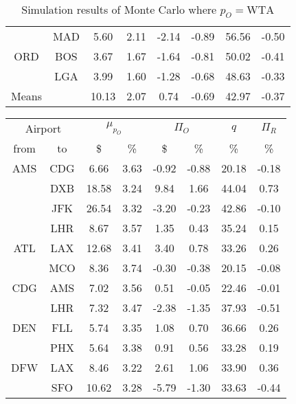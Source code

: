 \begin{table}
\begin{center}
\begin{tabular}{c c | c c | c c | c | c }
~    &  MAD  &    5.60  &  2.11  &   -2.14  &  -0.89  &  56.56  &  -0.50 \\[.5ex]
ORD  &  BOS  &    3.67  &  1.67  &   -1.64  &  -0.81  &  50.02  &  -0.41 \\
~    &  LGA  &    3.99  &  1.60  &   -1.28  &  -0.68  &  48.63  &  -0.33 \\
\midrule
Means &  ~   &   10.13  &  2.07  &    0.74  &  -0.69  &  42.97  &  -0.37 \\
    \bottomrule
\end{tabular}
\caption{Simulation results of Monte Carlo where $p_O = \mbox{WTA}$}
\label{tbl:resultsSecond}
\end{center}
\end{table}


\begin{table}
\begin{center}
\begin{tabular}{c c | c c | c c | c | c }
\toprule
\multicolumn{2}{c|}{Airport}  &  \multicolumn{2}{c|}{$\mu_{p_O}$} & \multicolumn{2}{c|}{$\Pi_O$}  &  $q$  & $\Pi_R$ \\[.4ex]
from  &  to  &  \$  & \%  &  \$  & \%  & \%  & \% \\
    \midrule
AMS  &  CDG  &    6.66  &  3.63  &   -0.92  &  -0.88  &  20.18  &  -0.18 \\
~    &  DXB  &   18.58  &  3.24  &    9.84  &  1.66  &  44.04  &  0.73 \\
~    &  JFK  &   26.54  &  3.32  &   -3.20  &  -0.23  &  42.86  &  -0.10 \\
~    &  LHR  &    8.67  &  3.57  &    1.35  &  0.43  &  35.24  &  0.15 \\[.5ex]
ATL  &  LAX  &   12.68  &  3.41  &    3.40  &  0.78  &  33.26  &  0.26 \\
~    &  MCO  &    8.36  &  3.74  &   -0.30  &  -0.38  &  20.15  &  -0.08 \\[.5ex]
CDG  &  AMS  &    7.02  &  3.56  &    0.51  &  -0.05  &  22.46  &  -0.01 \\
~    &  LHR  &    7.32  &  3.47  &   -2.38  &  -1.35  &  37.93  &  -0.51 \\[.5ex]
DEN  &  FLL  &    5.74  &  3.35  &    1.08  &  0.70  &  36.66  &  0.26 \\
~    &  PHX  &    5.64  &  3.38  &    0.91  &  0.56  &  33.28  &  0.19 \\[.5ex]
DFW  &  LAX  &    8.46  &  3.22  &    2.61  &  1.06  &  33.90  &  0.36 \\
~    &  SFO  &   10.62  &  3.28  &   -5.79  &  -1.30  &  33.63  &  -0.44 \\[.5ex]

\end{tabular}
\end{center}
\end{table}
